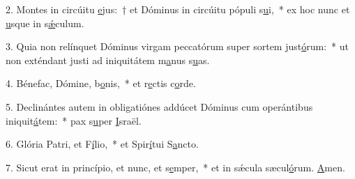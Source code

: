 2. Montes in circúitu \uline{e}jus:~† et Dóminus in circúitu pópuli s\uline{u}i,~* ex hoc nunc et \uline{u}sque in s\uline{ǽ}culum.\par 
3. Quia non relínquet Dóminus virgam peccatórum super sortem just\uline{ó}rum:~* ut non exténdant justi ad iniquitátem m\uline{a}nus s\uline{u}as.\par 
4. Bénefac, Dómine, b\uline{o}nis,~* et r\uline{e}ctis c\uline{o}rde.\par 
5. Declinántes autem in obligatiónes addúcet Dóminus cum operántibus iniquit\uline{á}tem:~* pax s\uline{u}per \uline{I}sraël.\par 
6. Glória Patri, et F\uline{í}lio,~* et Spir\uline{í}tui S\uline{a}ncto.\par 
7. Sicut erat in princípio, et nunc, et s\uline{e}mper,~* et in sǽcula sæcul\uline{ó}rum. \uline{A}men.\par 
